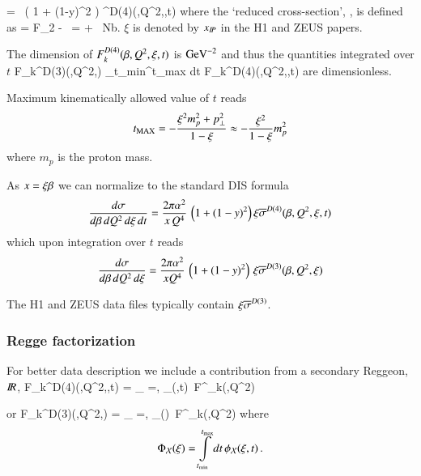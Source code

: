 \beq
=
  \,
    \left( 1 +  (1-y)^2 \right) \sigRed^{D(4)}(\beta,Q^2,\xP,t)
\label{Dxs}
\eeq
where the `reduced cross-section', \sigRed, is defined as
\beq
\label{eq:sigred}
\sigRed
 = F_2 - \, \FL
 = \FT + \, \FL
\eeq
Nb. $\xi$ is denoted by $x_{I\!P}$ in the H1 and ZEUS papers.

The dimension of 
\(
F_k^{D(4)}(\beta,Q^2,\xi,t)\)
is $\GeV^{-2}$
and
thus the quantities integrated over $t$
\beq
F_k^{D(3)}(\beta,Q^2,\xP)
\equiv
\int_{t_{\rm min}}^{t_{\rm max}} dt
F_k^{D(4)}(\beta,Q^2,\xP,t)
\eeq
are dimensionless.

Maximum kinematically allowed value of $t$ reads
\begin{equation}
t_{\rm MAX} 
=
-\frac{\xi^2 m_p^2 + p_\perp^2}{1-\xi}
\approx 
-\frac{\xi^2}{1-\xi} m_p^2
\end{equation}
where $m_p$ is the proton mass.

As $x = \xi\beta$ we can normalize to the standard DIS formula
\begin{equation}
\frac{d\sigma}{d\beta\,dQ^2\,d\xi\,dt} =
  \frac{2\pi\alpha^2}{x\, Q^4}\,
    \left( 1 +  (1-y)^2 \right) \xi\overline\sigma^{D(4)}(\beta,Q^2,\xi,t)
\end{equation}
which upon integration over $t$ reads
\begin{equation}
\label{Dxs3}
  \frac{d\sigma}{d\beta\,dQ^2\,d\xi}
=  
  \frac{2\pi\alpha^2}{x Q^4}\,
    \left( 1 +  (1-y)^2 \right) \,\xi\overline\sigma^{D(3)}(\beta,Q^2,\xi)
\end{equation}


The H1 and ZEUS data files typically contain $\xi\overline\sigma^{D(3)}$.

\subsubsection {Regge factorization}

For better data description we include a contribution from a secondary Reggeon, ${I\!R}$,
\beq
F_k^{D(4)}(\beta,Q^2,\xP,t) = 
\sum_{ =\Pom,\Reg}
\phi_(\xP,t)\, F^_k(\beta,Q^2)
\eeq

or
\beq
\label{eq:FD3}
F_k^{D(3)}(\beta,Q^2,\xP) = 
\sum_{ =\Pom,\Reg}
\Phi_(\xP)\, F^_k(\beta,Q^2)
\eeq
where
\begin{equation}
\label{eq:intFlux}
\Phi_{\mathcal{X}}(\xi) =
\int\limits_{t_{\rm min}}^{t_{\rm max}} dt\, \phi_\mathcal{X}(\xi,t)
\,.
\end{equation}

